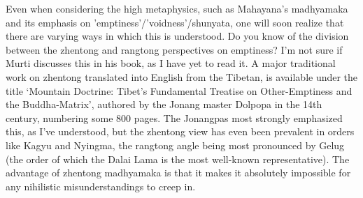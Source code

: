 \begin{footnotesize}
\begin{sffamily}
Even when considering the high metaphysics, such as Mahayana's madhyamaka and its emphasis on 'emptiness'/'voidness'/shunyata, one will soon realize that there are varying ways in which this is understood. Do you know of the division between the zhentong and rangtong perspectives on emptiness? I'm not sure if Murti discusses this in his book, as I have yet to read it. A major traditional work on zhentong translated into English from the Tibetan, is available under the title `Mountain Doctrine: Tibet's Fundamental Treatise on Other-Emptiness and the Buddha-Matrix', authored by the Jonang master Dolpopa in the 14th century, numbering some 800 pages. The Jonangpas most strongly emphasized this, as I've understood, but the zhentong view has even been prevalent in orders like Kagyu and Nyingma, the rangtong angle being most pronounced by Gelug (the order of which the Dalai Lama is the most well-known representative). The advantage of zhentong madhyamaka is that it makes it absolutely impossible for any nihilistic misunderstandings to creep in.

\hfill

\end{sffamily}
\end{footnotesize}


